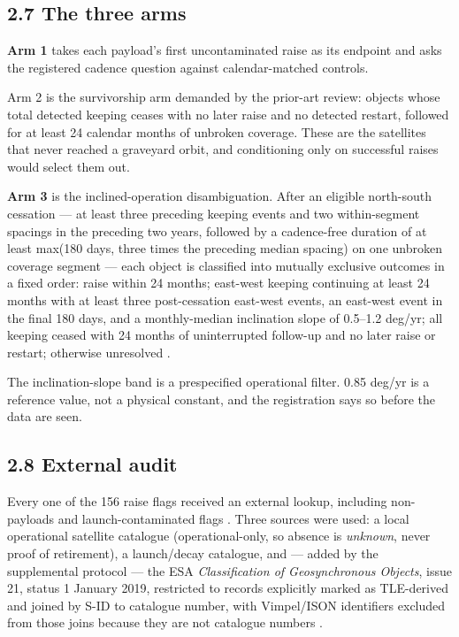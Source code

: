\documentclass[11pt]{article}
\begin{document}
\subsection*{2.7 The three arms}

\textbf{Arm 1} takes each payload's first uncontaminated raise as its endpoint and asks the registered cadence question against calendar-matched controls.

Arm 2 is the survivorship arm demanded by the prior-art review: objects whose total detected keeping ceases with no later raise and no detected restart, followed for at least 24 calendar months of unbroken coverage. These are the satellites that never reached a graveyard orbit, and conditioning only on successful raises would select them out.

\textbf{Arm 3} is the inclined-operation disambiguation. After an eligible north-south cessation --- at least three preceding keeping events and two within-segment spacings in the preceding two years, followed by a cadence-free duration of at least max(180 days, three times the preceding median spacing) on one unbroken coverage segment --- each object is classified into mutually exclusive outcomes in a fixed order: raise within 24 months; east-west keeping continuing at least 24 months with at least three post-cessation east-west events, an east-west event in the final 180 days, and a monthly-median inclination slope of 0.5--1.2 deg/yr; all keeping ceased with 24 months of uninterrupted follow-up and no later raise or restart; otherwise unresolved%
.

The inclination-slope band is a prespecified operational filter. 0.85 deg/yr is a reference value, not a physical constant, and the registration says so before the data are seen.

\subsection*{2.8 External audit}

Every one of the 156 raise flags received an external lookup, including non-payloads and launch-contaminated flags%
. Three sources were used: a local operational satellite catalogue (operational-only, so absence is \emph{unknown}, never proof of retirement), a launch/decay catalogue, and --- added by the supplemental protocol --- the ESA \emph{Classification of Geosynchronous Objects}, issue 21, status 1 January 2019, restricted to records explicitly marked as TLE-derived and joined by S-ID to catalogue number, with Vimpel/ISON identifiers excluded from those joins because they are not catalogue numbers%
.
\end{document}
